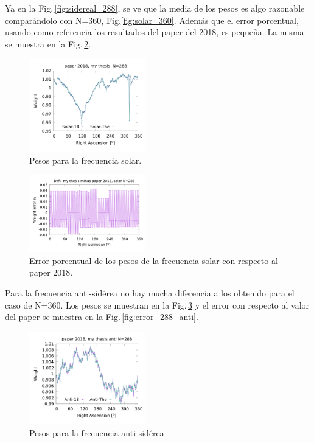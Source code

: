 Ya en la Fig.\,\ref{fig:sidereal_288}, se ve que la media de los pesos es algo razonable comparándolo con N=360, Fig.\ref{fig:solar_360}. Además que el error porcentual, usando como referencia los resultados del paper del 2018, es pequeña. La misma se muestra en la Fig.\,\ref{fig:error_288_solar}.

\begin{figure}[H]
	\centering
	\includegraphics[width=0.45\textwidth]{solar_my_and_paper_2018_in_288.png}
	\caption{Pesos para la frecuencia solar.}
	\label{fig:solar_288}
\end{figure}


\begin{figure}[H]
	\centering
	\includegraphics[width=0.45\textwidth]{solar_my_and_paper_in_288_error.png}
	\caption{Error porcentual de los pesos de la frecuencia solar con respecto al paper 2018.}
	\label{fig:error_288_solar}
\end{figure}

Para la frecuencia anti-sidérea no hay mucha diferencia a los obtenido para el caso de N=360. Los pesos se muestran en la Fig.\,\ref{fig:anti_288} y el error con respecto al valor del paper se muestra en la Fig.\,\ref{fig:error_288_anti}.

\begin{figure}[H]
	\centering
	\includegraphics[width=0.45\textwidth]{anti_my_and_paper_2018_in_288.png}
	\caption{Pesos para la frecuencia anti-sidérea}
	\label{fig:anti_288}
\end{figure}


